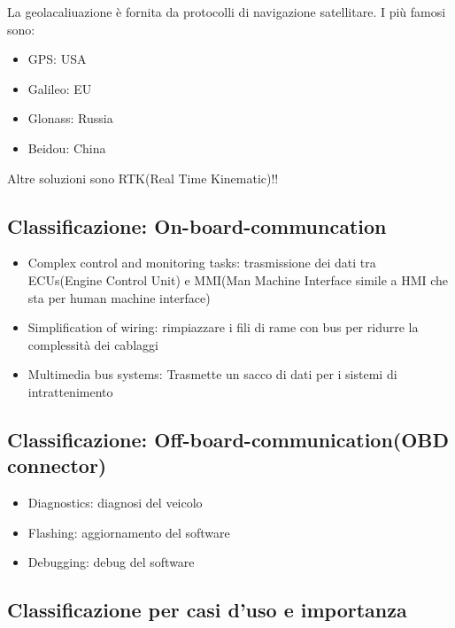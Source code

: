 La geolacaliuazione è fornita da protocolli di navigazione satellitare. I più famosi sono:
\begin{itemize}
	\item GPS: USA
	\item Galileo: EU
	\item Glonass: Russia
	\item Beidou: China
\end{itemize}

Altre soluzioni sono RTK(Real Time Kinematic)!!



\subsection{Classificazione: On-board-communcation}
\begin{itemize}
	\item Complex control and monitoring tasks: trasmissione dei dati tra ECUs(Engine Control Unit) e MMI(Man Machine Interface simile a HMI che sta per human machine interface)
	\item Simplification of wiring: rimpiazzare i fili di rame con bus per ridurre la complessità dei cablaggi
	\item Multimedia bus systems: Trasmette un sacco di dati per i sistemi di intrattenimento
\end{itemize}


\subsection{Classificazione: Off-board-communication(OBD connector)}
\begin{itemize}
	\item Diagnostics: diagnosi del veicolo
	\item Flashing: aggiornamento del software
	\item Debugging: debug del software
\end{itemize}

\subsection{Classificazione per casi d'uso e importanza}

